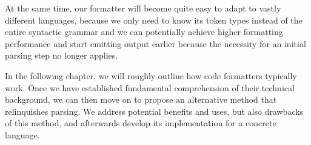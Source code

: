 At the same time, our formatter will become quite easy to adapt to vastly different languages,
because we only need to know its token types instead of the entire syntactic grammar and
we can potentially achieve higher formatting performance and start emitting output earlier
because the necessity for an initial parsing step no longer applies.

In the following chapter, we will roughly outline how code formatters typically work.
Once we have established fundamental comprehension of their technical background,
we can then move on to propose an alternative method that relinquishes parsing.
We address potential benefits and uses, but also drawbacks of this method,
and afterwards develop its implementation for a concrete language.
